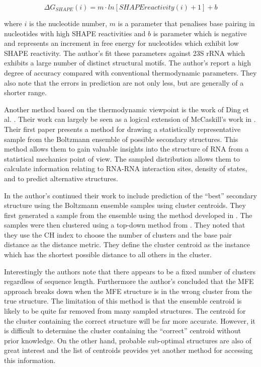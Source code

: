 \documentclass[journal]{IEEEtran}
\begin{document}
\begin{equation}
	\Delta G_{SHAPE}(i) = m \cdot ln[SHAPEreactivity(i) + 1] + b
\end{equation}

where $i$ is the nucleotide number, $m$ is a parameter that penalises base pairing in nucleotides with high SHAPE reactivities and $b$ is parameter which is negative and represents an increment in free energy for nucleotides which exhibit low SHAPE reactivity. The author's fit these parameters against 23S rRNA which exhibits a large number of distinct structural motifs. The author's report a high degree of accuracy compared with conventional thermodynamic parameters. They also note that the errors in prediction are not only less, but are generally of a shorter range.

Another method based on the thermodynamic viewpoint is the work of Ding et al. \cite{ding2003statistical, ding2005rna}. Their work can largely be seen as a logical extension of McCaskill's work in \cite{mccaskill1990equilibrium}. Their first paper \cite{ding2003statistical} presents a method for drawing a statistically representative sample from the Boltzmann ensemble of possible secondary structures. This method allows them to gain valuable insights into the structure of RNA from a statistical mechanics point of view. The sampled distribution allows them to calculate information relating to RNA-RNA interaction sites, density of states, and to predict alternative structures.

In \cite{ding2005rna} the author's continued their work to include prediction of the ``best'' secondary structure using the Boltzmann ensemble samples using cluster centroids. They first generated a sample from the ensemble using the method developed in \cite{ding2003statistical}. The samples were then clustered using a top-down method from \cite{rousseeuw1990finding}. They noted that they use the CH index to choose the number of clusters and the base pair distance as the distance metric. They define the cluster centroid as the instance which has the shortest possible distance to all others in the cluster.

Interestingly the authors note that there appears to be a fixed number of clusters regardless of sequence length. Furthermore the author's concluded that the MFE approach breaks down when the MFE structure is in the wrong cluster from the true structure. The limitation of this method is that the ensemble centroid is likely to be quite far removed from many sampled structures. The centroid for the cluster containing the correct structure will be far more accurate. However, it is difficult to determine the cluster containing the ``correct'' centroid without prior knowledge. On the other hand, probable sub-optimal structures are also of great interest and the list of centroids provides yet another method for accessing this information.
\end{document}
